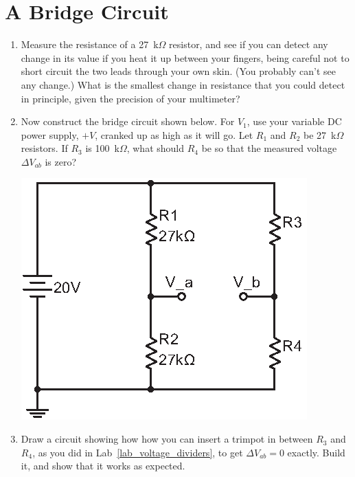 \section{A Bridge Circuit}
\label{lab_bridge}


\bigskip

\begin{enumerate}[wide]

\item Measure the resistance of a 27~k$\Omega$ resistor, and see if you can detect any change in its value if you heat it up between your fingers, being careful not to short circuit the two leads through your own skin.  (You probably can't see any change.)  What is the smallest change in resistance that you could detect in principle, given the precision of your multimeter?

\item Now construct the bridge circuit shown below.  For $V_1$, use your variable DC power supply, $+V$, cranked up as high as it will go.  Let $R_1$ and $R_2$ be 27~k$\Omega$ resistors.  If $R_3$ is 100~k$\Omega$, what should $R_4$ be so that the measured voltage $\Delta V_{ab}$ is zero?  

\begin{center}
\vspace{0.1in}
\includegraphics{bridge_circuit/bridge.eps}
\end{center}

\item Draw a circuit showing how how you can insert a trimpot in between $R_3$ and $R_4$, as you did in Lab~\ref{lab_voltage_dividers}, to get $\Delta V_{ab} = 0$ exactly.  Build it, and show that it works as expected.
	

\end{enumerate}
